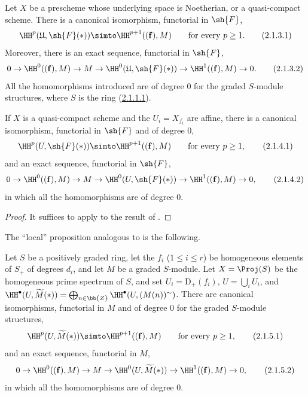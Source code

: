 \begin{proposition}[2.1.3]
\label{III.2.1.3}
Let $X$ be a prescheme whose underlying space is Noetherian, or a quasi-compact scheme.
There is a canonical isomorphism, functorial in $\sh{F}$,
\[
\label{III.2.1.3.1}
  \HH^p(\mathfrak{U},\sh{F}(*)) \simto \HH^{p+1}((\mathbf{f}),M)
  \qquad\text{for every } p\geq 1.
  \tag{2.1.3.1}
\]
Moreover, there is an exact sequence, functorial in $\sh{F}$,
\[
\label{III.2.1.3.2}
  0 \to \HH^0((\mathbf{f}),M) \to M \to \HH^0(\mathfrak{U},\sh{F}(*)) \to \HH^1((\mathbf{f}),M) \to 0.
  \tag{2.1.3.2}
\]
All the homomorphisms introduced are of degree $0$ for the graded $S$-module structures, where $S$ is the ring (\hyperref[III.2.1.1.1]{2.1.1.1}).
\end{proposition}

\begin{corollary}[2.1.4]
\label{III.2.1.4}
If $X$ is a quasi-compact scheme and the $U_i=X_{f_i}$ are affine, there is a canonical isomorphism, functorial in $\sh{F}$ and of degree $0$,
\[
\label{III.2.1.4.1}
  \HH^p(U,\sh{F}(*)) \simto \HH^{p+1}((\mathbf{f}),M)
  \qquad\text{for every } p\geq 1,
  \tag{2.1.4.1}
\]
and an exact sequence, functorial in $\sh{F}$,
\[
\label{III.2.1.4.2}
  0 \to \HH^0((\mathbf{f}),M) \to M \to \HH^0(U,\sh{F}(*)) \to \HH^1((\mathbf{f}),M) \to 0,
  \tag{2.1.4.2}
\]
in which all the homomorphisms are of degree $0$.
\end{corollary}

\begin{proof}
It suffices to apply  to the result of .
\end{proof}

The ``local'' proposition analogous to  is the following.

\begin{proposition}[2.1.5]
\label{III.2.1.5}
Let $S$ be a positively graded ring, let the $f_i$ ($1\leq i\leq r$) be homogeneous elements of $S_+$ of degrees $d_i$, and let $M$ be a graded $S$-module.
Let $X=\Proj(S)$ be the homogeneous prime spectrum of $S$, and set $U_i=\mathrm{D}_+(f_i)$, $U=\bigcup_i U_i$, and $\HH^\bullet(U,\widetilde{M}(*))=\bigoplus_{n\in\bb{Z}}\HH^\bullet(U,(M(n))^\sim)$.
There are canonical isomorphisms, functorial in $M$ and of degree $0$ for the graded $S$-module structures,
\[
\label{III.2.1.5.1}
  \HH^p(U,\widetilde{M}(*)) \simto \HH^{p+1}((\mathbf{f}),M)
  \qquad\text{for every } p\geq 1,
  \tag{2.1.5.1}
\]
and an exact sequence, functorial in $M$,
\[
\label{III.2.1.5.2}
  0 \to \HH^0((\mathbf{f}),M) \to M \to \HH^0(U,\widetilde{M}(*)) \to \HH^1((\mathbf{f}),M) \to 0,
  \tag{2.1.5.2}
\]
in which all the homomorphisms are of degree $0$.
\end{proposition}

